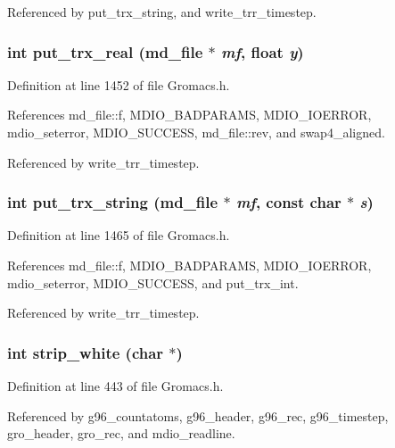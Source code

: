 Referenced by put\_\-trx\_\-string, and write\_\-trr\_\-timestep.
\subsubsection{\setlength{\rightskip}{0pt plus 5cm}int put\_\-trx\_\-real ({\bf md\_\-file} $\ast$ {\em mf}, float {\em y})\hspace{0.3cm}{\tt  [static]}}\label{Gromacs_8h_a67}




Definition at line 1452 of file Gromacs.h.

References md\_\-file::f, MDIO\_\-BADPARAMS, MDIO\_\-IOERROR, mdio\_\-seterror, MDIO\_\-SUCCESS, md\_\-file::rev, and swap4\_\-aligned.

Referenced by write\_\-trr\_\-timestep.
\subsubsection{\setlength{\rightskip}{0pt plus 5cm}int put\_\-trx\_\-string ({\bf md\_\-file} $\ast$ {\em mf}, const char $\ast$ {\em s})\hspace{0.3cm}{\tt  [static]}}\label{Gromacs_8h_a68}




Definition at line 1465 of file Gromacs.h.

References md\_\-file::f, MDIO\_\-BADPARAMS, MDIO\_\-IOERROR, mdio\_\-seterror, MDIO\_\-SUCCESS, and put\_\-trx\_\-int.

Referenced by write\_\-trr\_\-timestep.
\subsubsection{\setlength{\rightskip}{0pt plus 5cm}int strip\_\-white (char $\ast$)\hspace{0.3cm}{\tt  [static]}}\label{Gromacs_8h_a60}




Definition at line 443 of file Gromacs.h.

Referenced by g96\_\-countatoms, g96\_\-header, g96\_\-rec, g96\_\-timestep, gro\_\-header, gro\_\-rec, and mdio\_\-readline.
